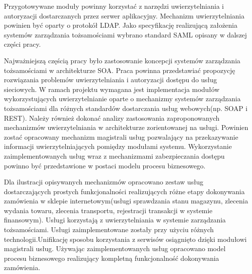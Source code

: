 	Przygotowywane moduły powinny korzystać z narzędzi uwierzytelniania i autoryzacji dostarczanych przez serwer aplikacyjny. Mechanizm uwierzytelniania powinien być oparty o protokół LDAP. Jako specyfikację realizującą założenia systemów zarządzania tożsamościami wybrano standard SAML opisany w dalszej części pracy.

	Najważniejszą częścią pracy było zastosowanie koncepcji systemów zarządzania tożsamościami w architekturze SOA. Praca powinna przedstawiać propozycję rozwiązania problemów uwierzytelniania i autoryzacji dostępu do usług sieciowych. W ramach projektu wymagana jest implementacja modułów wykorzystujących uwierzytelnianie oparte o mechanizmy systemów zarządzania tożsamościami dla różnych standardów dostarczania usług webowych(np. SOAP i REST). Należy również dokonać analizy zastosowania zaproponowanych mechanizmów uwierzytelniania w architekturze zorientowanej na usługi. Powinien zostać opracowany mechanizm magistrali usług pozwalający na przekazywanie informacji uwierzytelniających pomiędzy modułami systemu. Wykorzystanie zaimplementowanych usług wraz z mechanizmami zabezpieczania dostępu powinno być przedstawione w postaci modelu procesu biznesowego. 

	Dla ilustracji opisywanych mechanizmów opracowano zestaw usług dostarczających prostych funkcjonalności realizujących różne etapy dokonywania zamówienia w sklepie internetowym(usługi sprawdzania stanu magazynu, zlecenia wydania towaru,   zlecenia transportu, rejestracji transakcji w systemie finansowym). Usługi korzystają z uwierzytelniania w systemie zarządzania tożsamościami. Usługi zaimplementowane zostały przy użyciu różnych technologii.Unifikację sposobu korzystania z serwisów osiągnięto dzięki modułowi magistrali usług. Używając zaimplementowanych usług opracowano model procesu biznesowego realizujący kompletną funkcjonalność dokonywania zamówienia.
